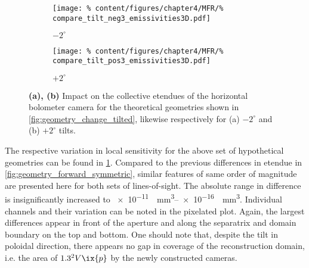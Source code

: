 %
            \begin{figure}[t]%
                \centering%
                \begin{subfigure}{0.47\textwidth}%
                    \texttt{[image: \%
                        content/figures/chapter4/MFR/\%
                        compare\_tilt\_neg3\_emissivities3D.pdf]}%
                    \caption{$-2^{\circ}$}%
                \end{subfigure}%
                \hfill%
                \begin{subfigure}{0.47\textwidth}%
                    \texttt{[image: \%
                        content/figures/chapter4/MFR/\%
                        compare\_tilt\_pos3\_emissivities3D.pdf]}%
                    \caption{$+2^{\circ}$}%
                \end{subfigure}%
                \caption{\textbf{(a), (b)} Impact on the collective etendues of the horizontal bolometer camera for the theoretical geometries shown in \cref{fig:geometry_change_tilted}, likewise respectively for (a) $-2^{\circ}$ and (b) $+2^{\circ}$ tilts.}\label{fig:emiss_change_tilted}%
            \end{figure}%
%
            The respective variation in local sensitivity for the above set of hypothetical geometries can be found in \cref{fig:emiss_change_tilted}. Compared to the previous differences in etendue in \cref{fig:geometry_forward_symmetric}, similar features of same order of magnitude are presented here for both sets of lines-of-sight. The absolute range in difference is insignificantly increased to \SIrange[per-mode=reciprocal]{e-11}{e-16}{\per\cubic\milli\meter}. Individual channels and their variation can be noted in the pixelated plot. Again, the largest differences appear in front of the aperture and along the separatrix and domain boundary on the top and bottom. One should note that, despite the tilt in poloidal direction, there appears no gap in coverage of the reconstruction domain, i.e. the area of $1.3^{2}V\ix{p}$ by the newly constructed cameras.\\%
%
